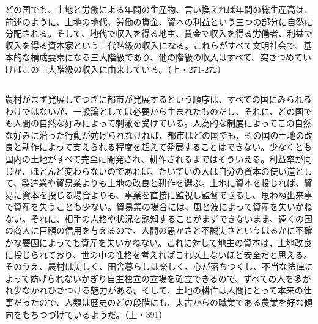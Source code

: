 どの国でも、土地と労働による年間の生産物、言い換えれば年間の総生産高は、前述のように、土地の地代、労働の賃金、資本の利益という三つの部分に自然に分配される。そして、地代で収入を得る地主、賃金で収入を得る労働者、利益で収入を得る資本家という三代階級の収入になる。これらがすべて文明社会で、基本的な構成要素になる三大階級であり、他の階級の収入はすべて、突きつめていけばこの三大階級の収入に由来している。（上・271-272）

\subsection{}



農村がまず発展してつぎに都市が発展するという順序は、すべての国にみられるわけではないが、一般論としては必要から生まれたものだし、それに、どの国でも人間の自然な好みによって刺激を受けている。人為的な制度によってこの自然な好みに沿った行動が妨げられなければ、都市はどの国でも、その国の土地の改良と耕作によって支えられる程度を超えて発展することはできない。少なくとも国内の土地がすべて完全に開発され、耕作されるまではそういえる。利益率が同じか、ほとんど変わらないのであれば、たいていの人は自分の資本の使い道として、製造業や貿易業よりも土地の改良と耕作を選ぶ。土地に資本を投じれば、貿易に資本を投じる場合よりも、事業を直接に監視し監督できるし、思わぬ出来事で資産を失うことも少ない。貿易業の場合には、風と波によって資産を失いかねない。それに、相手の人格や状況を熟知することがまずできないまま、遠くの国の商人に巨額の信用を与えるので、人間の愚かさと不誠実さというはるかに不確かな要因によっても資産を失いかねない。これに対して地主の資本は、土地改良に投じられており、世の中の性格を考えればこれ以上ないほど安全だと思える。そのうえ、農村は美しく、田舎暮らしは楽しく、心が落ちつくし、不当な法律によって妨げられないかぎり自主独立の立場を確立できるので、すべての人を多かれ少なかれひきつける魅力がある。そして、土地の耕作は人間にとって本来の仕事だったので、人類は歴史のどの段階にも、太古からの職業である農業を好む傾向をもちつづけているようだ。（上・391）

\subsection{}



